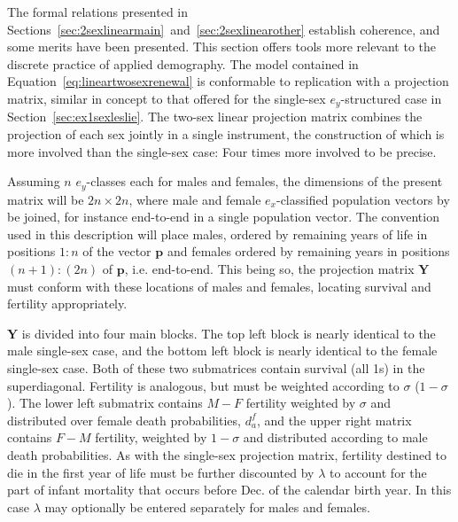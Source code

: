  \FloatBarrier
 \label{sec:ex2sxprojmat}
The formal relations presented in
Sections~\ref{sec:2sexlinearmain}~and~\ref{sec:2sexlinearother} establish
coherence, and some merits have been presented. This section offers tools
more relevant to the discrete practice of applied demography. The model
contained in Equation~\ref{eq:lineartwosexrenewal} is conformable to replication 
with a projection matrix, similar in concept to that offered for the 
single-sex $e_y$-structured
case in Section~\ref{sec:ex1sexleslie}. The two-sex linear projection matrix combines
the projection of each sex jointly in a single instrument, the construction of 
which is more involved than the single-sex case: Four times more involved to be precise. 

Assuming $n$ $e_y$-classes each for males and females, the dimensions of the
present matrix will be $2n \times 2n$, where male and female
$e_x$-classified population vectors by be joined, for instance end-to-end in a
single population vector. The convention used in this description will place
males, ordered by remaining years of life in positions $1:n$ of the vector
$\textbf{p}$ and females ordered by remaining years in positions $(n+1):(2n)$ of
$\textbf{p}$, i.e. end-to-end. This being so, the projection matrix $\textbf{Y}$
must conform with these locations of males and females, locating survival and 
fertility appropriately.

$\textbf{Y}$ is divided into four main blocks. The top left block is
nearly identical to the male single-sex case, and the bottom left block is
nearly identical to the female single-sex case. Both of these two submatrices
contain survival (all 1s) in the superdiagonal. Fertility is analogous, but must
be weighted according to $\sigma$ ($1-\sigma$). The lower left submatrix
contains $M-F$ fertility weighted by $\sigma$ and distributed over female death probabilities,
$d_a^f$, and the upper right matrix contains $F-M$ fertility, weighted by
$1-\sigma$ and distributed according to male death probabilities. As with the
single-sex projection matrix, fertility destined to die in the first year of
life must be further discounted by $\lambda$ to account for the part of infant
mortality that occurs before Dec.  of the calendar birth year. In this
case $\lambda$ may optionally be entered separately for males and females.

